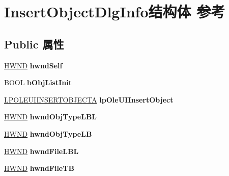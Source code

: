 \hypertarget{struct_insert_object_dlg_info}{}\section{Insert\+Object\+Dlg\+Info结构体 参考}
\label{struct_insert_object_dlg_info}
\subsection*{Public 属性}
\begin{DoxyCompactItemize}
\item 
\mbox{\label{struct_insert_object_dlg_info_aebc16b88110c81d0dc8f5386f212a53c}} 
\hyperlink{interfacevoid}{H\+W\+ND} {\bfseries hwnd\+Self}
\item 
\mbox{\label{struct_insert_object_dlg_info_a56ddc1e693e25c87a40c752b6c9ed68e}} 
B\+O\+OL {\bfseries b\+Obj\+List\+Init}
\item 
\mbox{\label{struct_insert_object_dlg_info_a690b4fffc600a4f488a7f72c4d41b1c5}} 
\hyperlink{structtag_o_l_e_u_i_i_n_s_e_r_t_o_b_j_e_c_t_a}{L\+P\+O\+L\+E\+U\+I\+I\+N\+S\+E\+R\+T\+O\+B\+J\+E\+C\+TA} {\bfseries lp\+Ole\+U\+I\+Insert\+Object}
\item 
\mbox{\label{struct_insert_object_dlg_info_a636e3626d86c8d58efefca86e3e3ba69}} 
\hyperlink{interfacevoid}{H\+W\+ND} {\bfseries hwnd\+Obj\+Type\+L\+BL}
\item 
\mbox{\label{struct_insert_object_dlg_info_a37800905985791a1251178b5e0938259}} 
\hyperlink{interfacevoid}{H\+W\+ND} {\bfseries hwnd\+Obj\+Type\+LB}
\item 
\mbox{\label{struct_insert_object_dlg_info_ad7be7e29f008e2d00be3b2a8357d15f4}} 
\hyperlink{interfacevoid}{H\+W\+ND} {\bfseries hwnd\+File\+L\+BL}
\item 
\mbox{\label{struct_insert_object_dlg_info_ac9eb742e722b57cc5c47b5f10dc2e09e}} 
\hyperlink{interfacevoid}{H\+W\+ND} {\bfseries hwnd\+File\+TB}
\item 

\end{DoxyCompactItemize}
